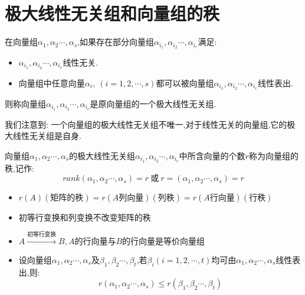 \section{极大线性无关组和向量组的秩}
\begin{definition}[极大线性无关组]
	在向量组$\alpha_{1},\alpha_{2}\cdots,\alpha_{s}$,如果存在部分向量组$\alpha_{i_{1}},\alpha_{i_{2}}\cdots,\alpha_{i_{r}}$满足:  
	\begin{itemize}
		\item $\alpha_{i_{1}},\alpha_{i_{2}}\cdots,\alpha_{i_{r}}\text{线性无关.}$
		\item $\text{向量组中任意向量}\alpha_{i},\ (i=1,2,\cdots,s)\text{都可以被向量组}\alpha_{i_{1}},\alpha_{i_{2}}\cdots,\alpha_{i_{r}}\text{线性表出.}$
	\end{itemize}
	则称向量组$\alpha_{i_{1}},\alpha_{i_{2}}\cdots,\alpha_{i_{r}}$是原向量组的一个极大线性无关组.
	
	我们注意到:  一个向量组的极大线性无关组不唯一,对于线性无关的向量组,它的极大线性无关组是自身.
\end{definition}

\begin{definition}[向量组的秩]
	向量组$\alpha_{1},\alpha_{2}\cdots,\alpha_{s}$的极大线性无关组$\alpha_{i_{1}},\alpha_{i_{2}}\cdots,\alpha_{i_{r}}$中所含向量的个数$r$称为向量组的秩,记作:  
	$$rank(\alpha_{1},\alpha_{2}\cdots,\alpha_{s})=r\ \text{或}\ r=(\alpha_{1},\alpha_{2}\cdots,\alpha_{s})=r$$
	\begin{property}
		\begin{itemize}
			\item $r(A)(\text{矩阵的秩})=r(A\text{列向量})(\text{列秩})=r(A\text{行向量})(\text{行秩})$
			\item $\text{初等行变换和列变换不改变矩阵的秩}$
			\item $A\overset{\text{初等行变换}}{\longrightarrow}B,A\text{的行向量与}B\text{的行向量是等价向量组}$
			\item $\text{设向量组}\alpha_{1},\alpha_{2}\cdots,\alpha_{s}\text{及}\beta_{1},\beta_{2}\cdots,\beta_{t}$,$\text{若}\beta_{i}(i=1,2,\cdots,t)\text{均可由}\alpha_{1},\alpha_{2}\cdots,\alpha_{s}$线性表出,则:  
			$$r(\alpha_{1},\alpha_{2}\cdots,\alpha_{s})\leq r(\beta_{1},\beta_{2}\cdots,\beta_{t})$$
		\end{itemize}
	\end{property}
\end{definition}
